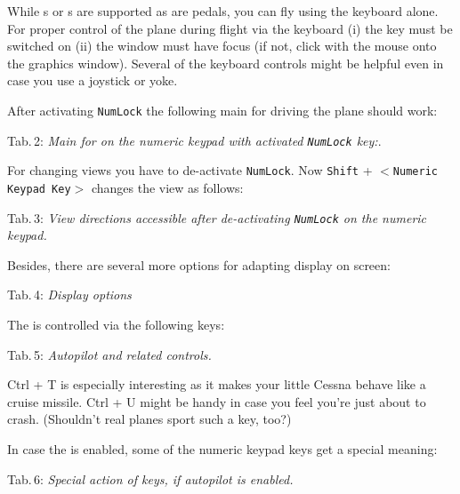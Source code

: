 While s or s are supported as are  pedals, you
can fly \FlightGear{} using the keyboard alone. For proper control of the plane during
flight via the keyboard (i) the \texttt{} key must be switched on (ii) the
\FlightGear{} window must have focus (if not, click with the mouse onto the graphics
window). Several of the keyboard controls might be helpful even in case you use a
joystick or yoke.

After activating \texttt{NumLock} the following main  for driving the plane should work:
 \eject

\noindent
 Tab.\,2: \textit{Main  for \FlightGear{} on the numeric keypad with
 activated \texttt{NumLock} key:}.
\medskip

\centerline{}
\vskip5mm

For changing views you have to de-activate \texttt{NumLock}. Now \texttt{Shift} +
$<$\texttt{Numeric Keypad Key}$>$ changes the view as follows:
\medskip

\noindent
 Tab.\,3: \textit{View directions
accessible after de-activating \texttt{NumLock} on the numeric keypad.}
\medskip

\centerline{}
\vskip5mm

Besides, there are several more options for adapting display on screen:
\vfill
\eject

\noindent
 Tab.\,4: \textit{Display options}
\medskip

\centerline{}
\vskip5mm

The  is controlled via the following keys:
\medskip

\noindent
 Tab.\,5: \textit{Autopilot and related controls.}
\medskip

\centerline{}
\medskip

\noindent Ctrl + T is especially interesting as it makes your little Cessna behave
like a cruise missile. Ctrl + U might be handy in case you feel you're just about to
crash. (Shouldn't real planes sport such a key, too?)

In case the  is enabled, some of the numeric keypad keys get a special
meaning:

\noindent
 Tab.\,6: \textit{Special action of keys, if autopilot is enabled.}
\medskip

\centerline{}
\medskip


